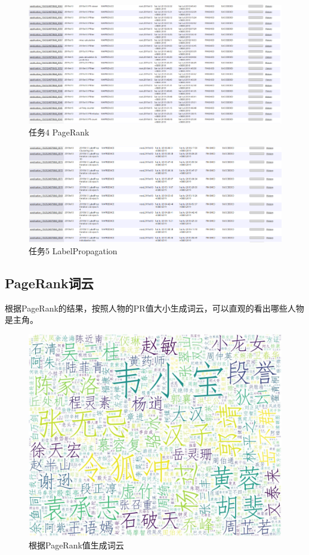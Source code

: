 \begin{figure}[htb]
	\centering
	\includegraphics[scale=0.35]{figures/task4.PNG}
	\caption{任务4 PageRank}
\end{figure}
\begin{figure}[htb]
	\centering
	\includegraphics[scale=0.35]{figures/task5.PNG}
	\caption{任务5 LabelPropagation}
\end{figure}

\newpage
\newpage
\subsection{PageRank词云}
根据PageRank的结果，按照人物的PR值大小生成词云，可以直观的看出哪些人物是主角。
\begin{figure}[ht]
	\centering
	\includegraphics[scale=0.38]{figures/wordcloud.jpg}
	\caption{根据PageRank值生成词云}
\end{figure}

